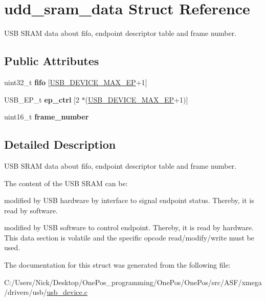 \hypertarget{structudd__sram__data}{\section{udd\-\_\-sram\-\_\-data Struct Reference}
\label{structudd__sram__data}
}


U\-S\-B S\-R\-A\-M data about fifo, endpoint descriptor table and frame number.  


\subsection*{Public Attributes}
\begin{DoxyCompactItemize}
\item 
\hypertarget{structudd__sram__data_aad116702d70b883f4a76eb964018678a}{uint32\-\_\-t {\bfseries fifo} \mbox{[}\hyperlink{group__udi__cdc__group__single__desc_ga94a9c8812ccfd31f8b0398b666c54453}{U\-S\-B\-\_\-\-D\-E\-V\-I\-C\-E\-\_\-\-M\-A\-X\-\_\-\-E\-P}+1\mbox{]}}\label{structudd__sram__data_aad116702d70b883f4a76eb964018678a}

\item 
\hypertarget{structudd__sram__data_a007c2bc709284a3bcbec637b8063f3fd}{U\-S\-B\-\_\-\-E\-P\-\_\-t {\bfseries ep\-\_\-ctrl} \mbox{[}2 $\ast$(\hyperlink{group__udi__cdc__group__single__desc_ga94a9c8812ccfd31f8b0398b666c54453}{U\-S\-B\-\_\-\-D\-E\-V\-I\-C\-E\-\_\-\-M\-A\-X\-\_\-\-E\-P}+1)\mbox{]}}\label{structudd__sram__data_a007c2bc709284a3bcbec637b8063f3fd}

\item 
\hypertarget{structudd__sram__data_a73d612bb10856496ced32345cb6666eb}{uint16\-\_\-t {\bfseries frame\-\_\-number}}\label{structudd__sram__data_a73d612bb10856496ced32345cb6666eb}

\end{DoxyCompactItemize}


\subsection{Detailed Description}
U\-S\-B S\-R\-A\-M data about fifo, endpoint descriptor table and frame number. 

The content of the U\-S\-B S\-R\-A\-M can be\-:
\begin{DoxyItemize}
\item modified by U\-S\-B hardware by interface to signal endpoint status. Thereby, it is read by software.
\item modified by U\-S\-B software to control endpoint. Thereby, it is read by hardware. This data section is volatile and the specific opcode read/modify/write must be used. 
\end{DoxyItemize}

The documentation for this struct was generated from the following file\-:\begin{DoxyCompactItemize}
\item 
C\-:/\-Users/\-Nick/\-Desktop/\-One\-Pos\-\_\-programming/\-One\-Pos/\-One\-Pos/src/\-A\-S\-F/xmega/drivers/usb/\hyperlink{usb__device_8c}{usb\-\_\-device.\-c}\end{DoxyCompactItemize}
